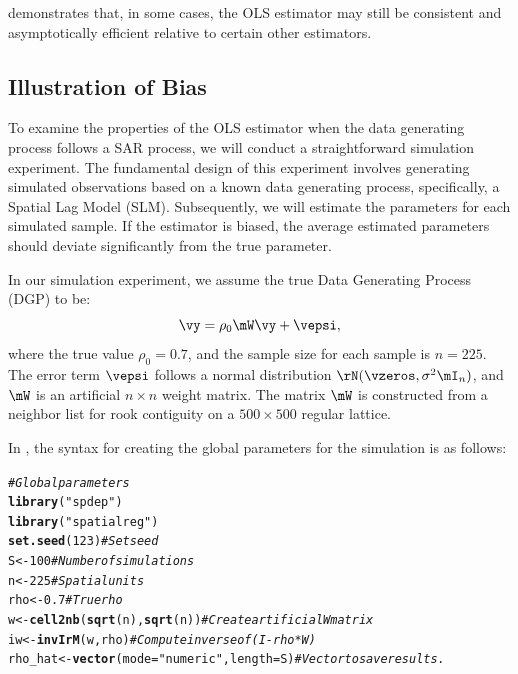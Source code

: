 \documentclass[english,12pt]{book}\usepackage[]{graphicx}\usepackage[]{xcolor}
\makeatletter
\newcommand{\hlnum}[1]{\textcolor[rgb]{0.686,0.059,0.569}{#1}}%
\newcommand{\hlsng}[1]{\textcolor[rgb]{0.192,0.494,0.8}{#1}}%
\newcommand{\hlcom}[1]{\textcolor[rgb]{0.678,0.584,0.686}{\textit{#1}}}%
\newcommand{\hldef}[1]{\textcolor[rgb]{0.345,0.345,0.345}{#1}}%
\newcommand{\hlkwb}[1]{\textcolor[rgb]{0.69,0.353,0.396}{#1}}%
\newcommand{\hlkwc}[1]{\textcolor[rgb]{0.333,0.667,0.333}{#1}}%
\newcommand{\hlkwd}[1]{\textcolor[rgb]{0.737,0.353,0.396}{\textbf{#1}}}%
\newenvironment{kframe}{%
 \def\at@end@of@kframe{}%
 \ifinner\ifhmode%
  \def\at@end@of@kframe{\end{minipage}}%
  \begin{minipage}{\columnwidth}%
 \fi\fi%
 \def\FrameCommand##1{\hskip\@totalleftmargin \hskip-\fboxsep
 \colorbox{shadecolor}{##1}\hskip-\fboxsep
     \hskip-\linewidth \hskip-\@totalleftmargin \hskip\columnwidth}%
 \MakeFramed {\advance\hsize-\width
   \@totalleftmargin\z@ \linewidth\hsize
   \@setminipage}}%
 {\par\unskip\endMakeFramed%
 \at@end@of@kframe}
\newenvironment{knitrout}{}{} %
\makeatother
\begin{document}
\begin{remark}
  \cite{lee2002consistency} demonstrates that, in some cases, the OLS estimator may still be consistent and asymptotically efficient relative to certain other estimators.
\end{remark}

\subsection{Illustration of Bias}

To examine the properties of the OLS estimator when the data generating process follows a SAR process, we will conduct a straightforward simulation experiment. The fundamental design of this experiment involves generating simulated observations based on a known data generating process, specifically, a Spatial Lag Model (SLM). Subsequently, we will estimate the parameters for each simulated sample. If the estimator is biased, the average estimated parameters should deviate significantly from the true parameter.

In our simulation experiment, we assume the true Data Generating Process (DGP) to be:
\begin{equation*}
  \vy = \rho_0\mW\vy + \vepsi,
\end{equation*}
%
where the true value $\rho_0 = 0.7$, and the sample size for each sample is $n = 225$. The error term $\vepsi$ follows a normal distribution $\rN(\vzeros, \sigma^2\mI_n)$, and $\mW$ is an artificial $n\times n$ weight matrix. The matrix $\mW$ is constructed from a neighbor list for rook contiguity on a $500 \times 500$ regular lattice.

In , the syntax for creating the global parameters for the simulation is as follows:
\begin{knitrout}
\color{fgcolor}\begin{kframe}
\begin{alltt}
\hlcom{# Global parameters}
\hlkwd{library}\hldef{(}\hlsng{"spdep"}\hldef{)}
\hlkwd{library}\hldef{(}\hlsng{"spatialreg"}\hldef{)}
\hlkwd{set.seed}\hldef{(}\hlnum{123}\hldef{)}                                   \hlcom{# Set seed}
\hldef{S}       \hlkwb{<-} \hlnum{100}                                  \hlcom{# Number of simulations}
\hldef{n}       \hlkwb{<-} \hlnum{225}                                  \hlcom{# Spatial units}
\hldef{rho}     \hlkwb{<-} \hlnum{0.7}                                  \hlcom{# True rho}
\hldef{w}       \hlkwb{<-} \hlkwd{cell2nb}\hldef{(}\hlkwd{sqrt}\hldef{(n),} \hlkwd{sqrt}\hldef{(n))}            \hlcom{# Create artificial W matrix}
\hldef{iw}      \hlkwb{<-} \hlkwd{invIrM}\hldef{(w, rho)}                       \hlcom{# Compute inverse of (I - rho*W)}
\hldef{rho_hat} \hlkwb{<-} \hlkwd{vector}\hldef{(}\hlkwc{mode} \hldef{=} \hlsng{"numeric"}\hldef{,} \hlkwc{length} \hldef{= S)} \hlcom{# Vector to save results.}
\end{alltt}
\end{kframe}
\end{knitrout}
\end{document}
